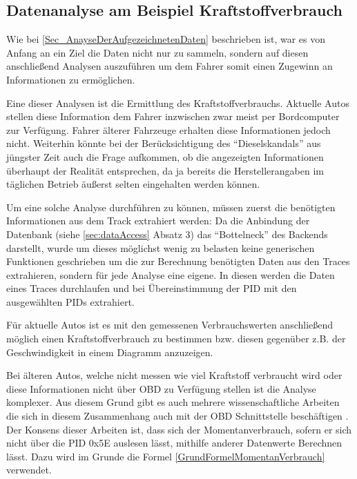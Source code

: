 \subsection{Datenanalyse am Beispiel Kraftstoffverbrauch}
Wie bei \ref{Sec_AnayseDerAufgezeichnetenDaten} beschrieben ist, war es von Anfang an ein Ziel die Daten nicht nur zu sammeln, sondern auf diesen anschließend Analysen auszuführen um dem Fahrer somit einen Zugewinn an Informationen zu ermöglichen. 

Eine dieser Analysen ist die Ermittlung des Kraftstoffverbrauchs. Aktuelle Autos stellen diese Information dem Fahrer inzwischen zwar meist per Bordcomputer zur Verfügung. Fahrer älterer Fahrzeuge erhalten diese Informationen jedoch nicht. Weiterhin könnte bei der Berücksichtigung des \enquote{Dieselskandals} aus jüngster Zeit auch die Frage aufkommen, ob die angezeigten Informationen überhaupt der Realität entsprechen, da ja bereits die Herstellerangaben im täglichen Betrieb äußerst selten eingehalten werden können.

Um eine solche Analyse durchführen zu können, müssen zuerst die benötigten Informationen aus dem Track extrahiert werden:\newline
Da die Anbindung der Datenbank (siehe \ref{sec:dataAccess} Absatz 3) das \enquote{Bottelneck} des Backends darstellt, wurde um dieses möglichst wenig zu belasten keine generischen Funktionen geschrieben um die zur Berechnung benötigten Daten aus den Traces extrahieren, sondern für jede Analyse eine eigene. In diesen werden die Daten eines Traces durchlaufen und bei Übereinstimmung der \acs{PID} mit den ausgewählten \acp{PID} extrahiert.

Für aktuelle Autos ist es mit den gemessenen Verbrauchswerten anschließend möglich einen Kraftstoffverbrauch zu bestimmen bzw. diesen gegenüber z.B. der Geschwindigkeit in einem Diagramm anzuzeigen.

Bei älteren Autos, welche nicht messen wie viel Kraftstoff verbraucht wird oder diese Informationen nicht über \ac{OBD} zu Verfügung stellen ist die Analyse komplexer. Aus diesem Grund gibt es auch mehrere wissenschaftliche Arbeiten die sich in diesem Zusammenhang auch mit der \ac{OBD} Schnittstelle beschäftigen \cite{obdConsumption} \cite{rtFuel}. Der Konsens dieser Arbeiten ist, dass sich der Momentanverbrauch, sofern er sich nicht über die \ac{PID} 0x5E auslesen lässt, mithilfe anderer Datenwerte Berechnen lässt.
Dazu wird im Grunde die Formel \ref{GrundFormelMomentanVerbrauch} verwendet. 

